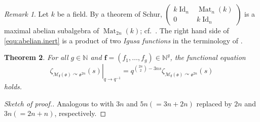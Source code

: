 \documentclass[11pt]{amsart}
\numberwithin{equation}{section}
\numberwithin{figure}{section}
\theoremstyle{plain}
\newtheorem{theorem}{Theorem}[section]
\theoremstyle{definition}
\theoremstyle{remark}
\newtheorem{remark}[theorem]{Remark}
\begin{document}
\begin{remark}
  Let $k$ be a field. By a theorem of Schur, $ \left( \begin{matrix}
    k\operatorname{Id}_n & \operatorname{Mat}_{n}(k)\\ 0 & k\operatorname{Id}_{n} \end{matrix}\right)$ is a
  maximal abelian subalgebra of $\operatorname{Mat}_{2n}(k)$;
  cf.\ \cite{Schur/05}. The right hand side of
  \eqref{equ:abelian.inert} is a product of two \emph{Igusa functions}
  in the terminology of \cite[Definition~2.5]{SV1/15}.
\end{remark}

\begin{theorem}\label{thm:funeq.abel}
  For all $g\in{\ensuremath{\mathbb{N}}}$ and ${\ensuremath{\mathbf{f}}}=(f_1,\dots,f_g)\in{\ensuremath{\mathbb{N}}}^g$, the functional
  equation
\begin{equation*}
  \left.\zeta_{{\mathcal{M}}_{\ensuremath{\mathbf{f}}}({\mathfrak o}) {\curvearrowright} {\mathfrak o}^{2n}}(s)\right|_{q{\rightarrow} q^{-1}}
  = q^{\binom{2n}{2}-3ns}\zeta_{{\mathcal{M}}_{\ensuremath{\mathbf{f}}}({\mathfrak o}){\curvearrowright} {\mathfrak o}^{2n}}(s)
\end{equation*}
holds.
\end{theorem}
\begin{proof}[Sketch of proof.] Analogous to \cite[Theorem~1.2]{SV1/15} with $3n$ and $5n(=3n+2n)$
replaced by $2n$ and $3n(=2n+n)$, respectively.
\end{proof}
\end{document}
